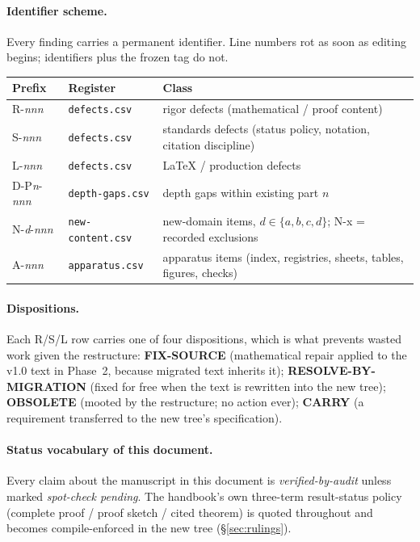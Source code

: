 \documentclass[11pt,letterpaper]{article}
\begin{document}
\paragraph{Identifier scheme.}
Every finding carries a permanent identifier.  Line numbers rot as soon
as editing begins; identifiers plus the frozen tag do not.

\begin{center}\small
\begin{tabular}{@{}llp{3.4in}@{}}
\toprule
\textbf{Prefix} & \textbf{Register} & \textbf{Class} \\
\midrule
R-\emph{nnn} & \texttt{defects.csv} & rigor defects (mathematical / proof content) \\
S-\emph{nnn} & \texttt{defects.csv} & standards defects (status policy, notation, citation discipline) \\
L-\emph{nnn} & \texttt{defects.csv} & \LaTeX{} / production defects \\
D-P\emph{n}-\emph{nnn} & \texttt{depth-gaps.csv} & depth gaps within existing part $n$ \\
N-\emph{d}-\emph{nnn} & \texttt{new-content.csv} & new-domain items, $d\in\{a,b,c,d\}$; N-x = recorded exclusions \\
A-\emph{nnn} & \texttt{apparatus.csv} & apparatus items (index, registries, sheets, tables, figures, checks) \\
\bottomrule
\end{tabular}
\end{center}

\paragraph{Dispositions.}
Each R/S/L row carries one of four dispositions, which is what prevents
wasted work given the restructure:
\textbf{FIX-SOURCE} (mathematical repair applied to the v1.0 text in
Phase~2, because migrated text inherits it);
\textbf{RESOLVE-BY-MIGRATION} (fixed for free when the text is rewritten
into the new tree);
\textbf{OBSOLETE} (mooted by the restructure; no action ever);
\textbf{CARRY} (a requirement transferred to the new tree's
specification).

\paragraph{Status vocabulary of this document.}
Every claim about the manuscript in this document is
\emph{verified-by-audit} unless marked \emph{spot-check pending}.  The
handbook's own three-term result-status policy (complete proof / proof
sketch / cited theorem) is quoted throughout and becomes
compile-enforced in the new tree (§\ref{sec:rulings}).
\end{document}
